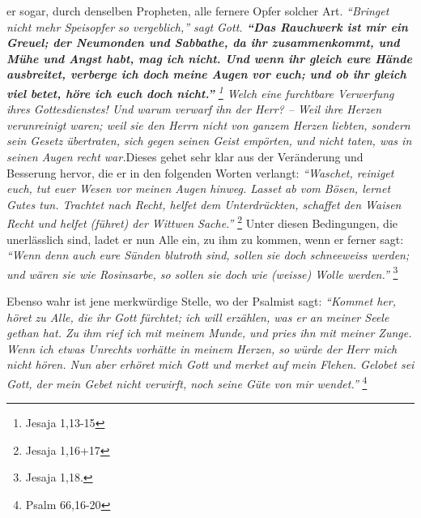 er sogar, durch denselben Propheten, alle fernere Opfer solcher Art.
\textit{\textit{"`Bringet nicht mehr Speisopfer so vergeblich,"'} sagt Gott.
\textbf{"`Das Rauchwerk ist mir ein Greuel; der Neumonden und Sabbathe, da ihr
zusammenkommt, und Mühe und Angst habt, mag ich nicht. Und wenn ihr gleich eure
Hände ausbreitet, verberge ich doch meine Augen vor euch; und ob ihr gleich viel
betet, höre ich euch doch nicht."'} 
\footnote{Jesaja 1,13-15}
Welch eine
furchtbare Verwerfung ihres Gottesdienstes! Und warum verwarf ihn der Herr? --
Weil ihre Herzen verunreinigt waren; weil sie den Herrn nicht von ganzem Herzen
liebten, sondern sein Gesetz übertraten, sich gegen seinen Geist empörten, und
nicht taten, was in seinen Augen recht war.}Dieses gehet sehr klar aus der
Veränderung und Besserung hervor, die er in den folgenden Worten verlangt:
\textit{"`Waschet, reiniget euch, tut euer Wesen vor meinen Augen hinweg. Lasset
ab vom
Bösen, lernet Gutes tun. Trachtet nach Recht, helfet dem Unterdrückten,
schaffet den Waisen Recht und helfet (führet) der Wittwen Sache."'}
\footnote{Jesaja 1,16+17}
Unter diesen Bedingungen, die unerlässlich sind, ladet er nun Alle ein,
zu ihm zu kommen, wenn er ferner sagt:
\textit{"`Wenn denn auch eure Sünden blutroth
sind, sollen sie doch schneeweiss werden; und wären sie wie Rosinsarbe, so
sollen sie doch wie (weisse) Wolle werden."'}
\footnote{Jesaja 1,18.}

\medskip

Ebenso wahr ist jene merkwürdige Stelle, wo der Psalmist sagt:
\textit{"`Kommet her,
höret zu Alle, die ihr Gott fürchtet; ich will erzählen, was er an meiner Seele
gethan hat. Zu ihm rief ich mit meinem Munde, und pries ihn mit meiner Zunge.
Wenn ich etwas Unrechts vorhätte in meinem Herzen, so würde der Herr mich nicht
hören. Nun aber erhöret mich Gott und merket auf mein Flehen. Gelobet sei Gott,
der mein Gebet nicht verwirft, noch seine Güte von mir wendet."'}
\footnote{Psalm 66,16-20}

